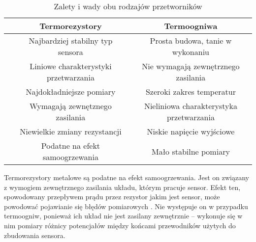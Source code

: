 \begin{table}[!htbp]
  \centering
  \caption{\label{tab:thermocouple-pros-cons}Zalety i wady obu rodzajów przetworników}
  \begin{tabular}{p{0.5cm}|c|c}
    \toprule
                                                                       & Termorezystory                        & Termoogniwa                              \\
    \midrule
    \parbox[t]{2mm}{} & Najbardziej stabilny typ sensora      & Prosta budowa, tanie w wykonaniu         \\
                                                                       & Liniowe charakterystyki przetwarzania & Nie wymagają zewnętrznego zasilania      \\
                                                                       & Najdokładniejsze pomiary              & Szeroki zakres temperatur                \\
    \midrule
    \parbox[t]{2mm}{}   & Wymagają zewnętznego zasilania        & Nieliniowa charakterystyka przetwarzania \\
                                                                       & Niewielkie zmiany rezystancji         & Niskie napięcie wyjściowe                \\
                                                                       & Podatne na efekt samoogrzewania       & Mało stabilne pomiary                    \\
    \bottomrule
  \end{tabular}
\end{table}

Termorezystory metalowe są podatne na efekt samoogrzewania. Jest on związany z wymogiem zewnętrznego
zasilania układu, którym pracuje sensor. Efekt ten, spowodowany przepływem prądu przez rezystor
jakim jest sensor, może powodować pojawianie się błędów pomiarowych \cite{self-heating}. Nie
występuje on w przypadku termoogniw, ponieważ ich układ nie jest zasilany zewnętrznie -- wykonuje
się w nim pomiary różnicy potencjałów między końcami przewodników użytych do zbudowania sensora.